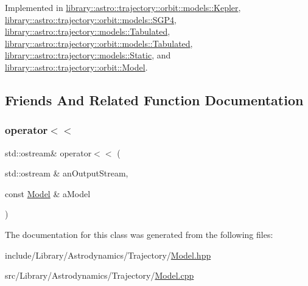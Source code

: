 Implemented in \hyperlink{classlibrary_1_1astro_1_1trajectory_1_1orbit_1_1models_1_1_kepler_a5cecedfe1b2002881b4ef6eeae64af93}{library\+::astro\+::trajectory\+::orbit\+::models\+::\+Kepler}, \hyperlink{classlibrary_1_1astro_1_1trajectory_1_1orbit_1_1models_1_1_s_g_p4_aca7d5615c14d59338506fb13630cd535}{library\+::astro\+::trajectory\+::orbit\+::models\+::\+S\+G\+P4}, \hyperlink{classlibrary_1_1astro_1_1trajectory_1_1models_1_1_tabulated_a3eae12849178fe43d30a620edceddd8e}{library\+::astro\+::trajectory\+::models\+::\+Tabulated}, \hyperlink{classlibrary_1_1astro_1_1trajectory_1_1orbit_1_1models_1_1_tabulated_a545a7209580a0c3863f37e2bdd925cb6}{library\+::astro\+::trajectory\+::orbit\+::models\+::\+Tabulated}, \hyperlink{classlibrary_1_1astro_1_1trajectory_1_1models_1_1_static_af8f9c6fa6ae2d4471868cc970e1ef571}{library\+::astro\+::trajectory\+::models\+::\+Static}, and \hyperlink{classlibrary_1_1astro_1_1trajectory_1_1orbit_1_1_model_abd4fb7604274cc8b3589a445db64e98c}{library\+::astro\+::trajectory\+::orbit\+::\+Model}.



\subsection{Friends And Related Function Documentation}
\mbox{\label{classlibrary_1_1astro_1_1trajectory_1_1_model_a68240493d08f91f6613186eb52823e85}} 
\subsubsection{\texorpdfstring{operator$<$$<$}{operator<<}}
{\footnotesize\ttfamily std\+::ostream\& operator$<$$<$ (\begin{DoxyParamCaption}\item[{std\+::ostream \&}]{an\+Output\+Stream,  }\item[{const \hyperlink{classlibrary_1_1astro_1_1trajectory_1_1_model}{Model} \&}]{a\+Model }\end{DoxyParamCaption})\hspace{0.3cm}{\ttfamily [friend]}}



The documentation for this class was generated from the following files\+:\begin{DoxyCompactItemize}
\item 
include/\+Library/\+Astrodynamics/\+Trajectory/\hyperlink{_model_8hpp}{Model.\+hpp}\item 
src/\+Library/\+Astrodynamics/\+Trajectory/\hyperlink{_model_8cpp}{Model.\+cpp}\end{DoxyCompactItemize}

